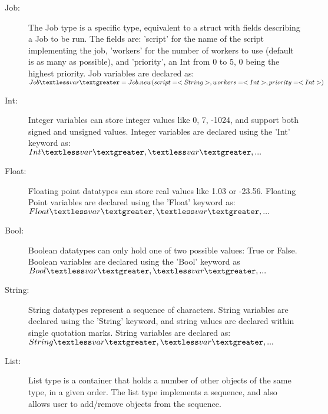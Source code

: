\begin{description}
\item [Job:] The Job type is a \lang{} specific type, equivalent to a struct
with fields describing a Job to be run. The fields are: 'script' for the
name of the script implementing the job, 'workers' for the number of workers to use
(default is as many as possible), and 'priority', an Int from 0 to 5, 0 being the
highest priority.
Job variables are declared as:
$Job \textless var\textgreater = Job.new(script=<String>, workers=<Int>, priority=<Int>)$

\item [Int:] Integer variables can store integer values like 0, 7, -1024,
and support both signed and unsigned values. Integer variables are declared
using the 'Int' keyword as:
$Int \textless var\textgreater, \textless var\textgreater, ...$ 


\item [Float:] Floating point datatypes can store real values like 1.03 or -23.56.
Floating Point variables are declared using the 'Float' keyword as:
$Float \textless  var\textgreater, \textless  var\textgreater, ...$



\item [Bool:] Boolean datatypes can only hold one of two possible values:
True or False. Boolean variables are declared using the 'Bool' keyword as
$Bool \textless  var\textgreater, \textless  var\textgreater, ...$
%



\item [String:] String datatypes represent a sequence of characters. String
variables are declared using the 'String' keyword, and string values are 
declared within single quotation marks.
String variables are declared as:
$String \textless var\textgreater, \textless  var\textgreater, ...$


\item [List:]
List type is a container that holds a number of other objects of the same type,
in a given order. The list type implements a sequence, and also allows user to
add/remove objects from the sequence.


\end{description}
